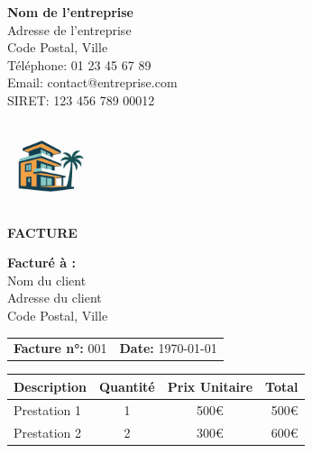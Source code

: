 \documentclass[12pt,a4paper]{article}
\begin{document}
\begin{minipage}{0.65\textwidth}
    {\Huge \textbf{Nom de l'entreprise}}\\
    Adresse de l'entreprise\\
    Code Postal, Ville\\
    Téléphone: 01 23 45 67 89\\
    Email: contact@entreprise.com\\
    SIRET: 123 456 789 00012
\end{minipage}
\hfill
\begin{minipage}{0.3\textwidth}
    \includegraphics[width=2.5cm]{assets/logo.png}
\end{minipage}

\vspace{0.5cm}

{\LARGE \textbf{FACTURE}}

\vspace{0.5cm}

\noindent
\textbf{Facturé à :} \\
Nom du client \\
Adresse du client \\
Code Postal, Ville \\

\vspace{0.5cm}

\begin{tabular}{ll}
\textbf{Facture n°:} 001 & \textbf{Date:} \today \\
\end{tabular}

\vspace{0.8cm}

\begin{tabular}{|l|c|c|r|}
\hline
\textbf{Description} & \textbf{Quantité} & \textbf{Prix Unitaire} & \textbf{Total} \\
\hline
Prestation 1         & 1                & 500€                  & 500€ \\
Prestation 2         & 2                & 300€                  & 600€ \\
\hline
\end{tabular}
\end{document}

